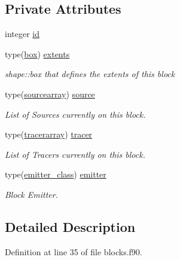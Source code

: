 \subsection*{Private Attributes}
\begin{DoxyCompactItemize}
\item 
integer \mbox{\hyperlink{structblocks__mod_1_1block__class_addd1a493d56aa1ffd1bc27c56b682065}{id}}
\item 
type(\mbox{\hyperlink{structgeometry__mod_1_1box}{box}}) \mbox{\hyperlink{structblocks__mod_1_1block__class_aff3b0cb7d8248f8a87691a028de916d3}{extents}}
\begin{DoxyCompactList}\small\item\em shape\+::box that defines the extents of this block \end{DoxyCompactList}\item 
type(\mbox{\hyperlink{structsources__array__mod_1_1sourcearray}{sourcearray}}) \mbox{\hyperlink{structblocks__mod_1_1block__class_a398a25c84b76ebe336c1384552bda602}{source}}
\begin{DoxyCompactList}\small\item\em List of Sources currently on this block. \end{DoxyCompactList}\item 
type(\mbox{\hyperlink{structtracer__array__mod_1_1tracerarray}{tracerarray}}) \mbox{\hyperlink{structblocks__mod_1_1block__class_ac1deffab20b882618041f0dcc0e58c22}{tracer}}
\begin{DoxyCompactList}\small\item\em List of Tracers currently on this block. \end{DoxyCompactList}\item 
type(\mbox{\hyperlink{structemitter__mod_1_1emitter__class}{emitter\+\_\+class}}) \mbox{\hyperlink{structblocks__mod_1_1block__class_a55e85183ba871abcaba1c00d5393611f}{emitter}}
\begin{DoxyCompactList}\small\item\em Block Emitter. \end{DoxyCompactList}\end{DoxyCompactItemize}


\subsection{Detailed Description}


Definition at line 35 of file blocks.\+f90.



